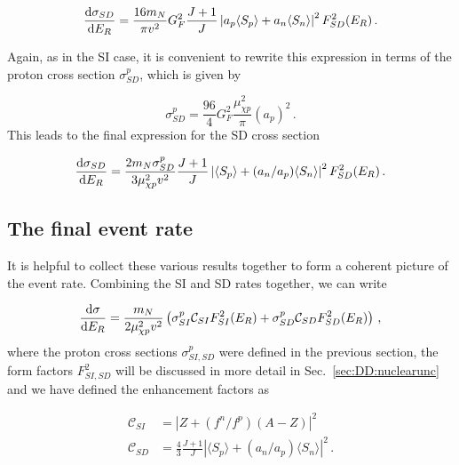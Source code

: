 \begin{equation}
\frac{\mathrm{d}\sigma_{SD}}{\mathrm{d}E_R} = \frac{16 m_N}{\pi v^2} G_F^2 \frac{J + 1}{J} \left| a_p \langle S_p \rangle + a_n \langle S_n \rangle \right|^2 F_{SD}^2(E_R)\,.
\end{equation}

Again, as in the SI case, it is convenient to rewrite this expression in terms of the proton cross section $\sigma_{SD}^p$, which is given by 

\begin{equation}
\sigma_{SD}^{p} = \frac{96}{4} G_F^2 \frac{\mu_{\chi p}^2}{\pi} (a_p)^2\,.
\end{equation}
This leads to the final expression for the SD cross section

\begin{equation}
\label{DD:eq:sigsd}
\frac{\mathrm{d}\sigma_{SD}}{\mathrm{d}E_R} = \frac{2 m_N \sigma_{SD}^p}{3 \mu_{\chi p}^2 v^2} \frac{J+1}{J} \left| \langle S_p \rangle + (a_n/a_p) \langle S_n \rangle \right|^2 F_{SD}^2(E_R)\,.
\end{equation}

\subsection{The final event rate}

It is helpful to collect these various results together to form a coherent picture of the event rate. Combining the SI and SD rates together, we can write

\begin{equation}
\label{eq:DD:fullsigma}
\frac{\mathrm{d}\sigma}{\mathrm{d}E_R} = \frac{m_N}{2 \mu_{\chi p}^2 v^2} \left( \sigma_{SI}^p \mathcal{C}_{SI} F_{SI}^2(E_R) + \sigma_{SD}^p \mathcal{C}_{SD} F_{SD}^2(E_R) \right)\,,
\end{equation}
where the proton cross sections $\sigma_{SI,SD}^p$ were defined in the previous section, the form factors $F_{SI,SD}^2$ will be discussed in more detail in Sec.~\ref{sec:DD:nuclearunc} and we have defined the enhancement factors as 

\begin{align}
\mathcal{C}_{SI} &= \left|Z + (f^n/f^p) (A-Z)\right|^2 \\
\mathcal{C}_{SD} &= \frac{4}{3}\frac{J+1}{J} \left| \langle S_p \rangle + (a_n/a_p) \langle S_n \rangle \right|^2\,.
\end{align}

